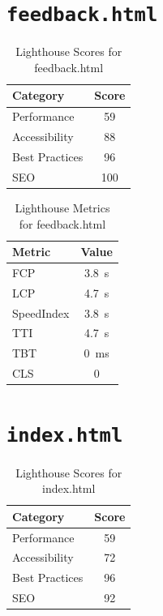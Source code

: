     \section{\texttt{feedback.html}}

    \begin{table}[H]
    \centering
    \caption{Lighthouse Scores for feedback.html}
    \begin{tabular}{|l|c|}
    \hline
    Category & Score \\ \hline
    Performance & 59 \\ \hline
    Accessibility & 88 \\ \hline
    Best Practices & 96 \\ \hline
    SEO & 100 \\ \hline
    \end{tabular}
    \end{table}

    \begin{table}[H]
    \centering
    \caption{Lighthouse Metrics for feedback.html}
    \begin{tabular}{|l|c|}
    \hline
    Metric & Value \\ \hline
    FCP & 3.8 s \\ \hline
    LCP & 4.7 s \\ \hline
    SpeedIndex & 3.8 s \\ \hline
    TTI & 4.7 s \\ \hline
    TBT & 0 ms \\ \hline
    CLS & 0 \\ \hline
    \end{tabular}
    \end{table}
    \section{\texttt{index.html}}

    \begin{table}[H]
    \centering
    \caption{Lighthouse Scores for index.html}
    \begin{tabular}{|l|c|}
    \hline
    Category & Score \\ \hline
    Performance & 59 \\ \hline
    Accessibility & 72 \\ \hline
    Best Practices & 96 \\ \hline
    SEO & 92 \\ \hline
    \end{tabular}
    \end{table}

